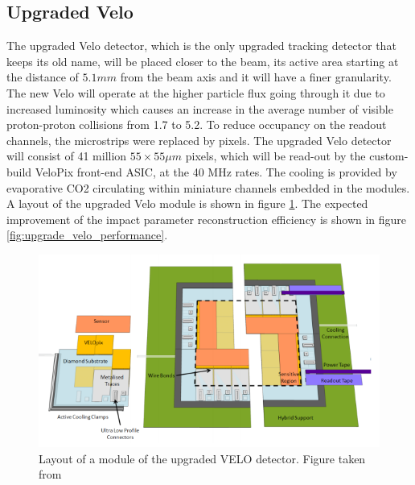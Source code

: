 \subsection{Upgraded Velo}
The upgraded Velo detector, which is the only upgraded tracking detector that keeps its old name, will be placed closer to the beam, its active area starting at the distance of $5.1 mm$ from the beam axis and it will have a finer granularity. The new Velo will operate at the higher particle flux going through it due to increased luminosity which causes an increase in the average number of visible proton-proton collisions from 1.7 to 5.2. To reduce occupancy on the readout channels, the microstrips were replaced by pixels. The upgraded Velo detector will consist of 41 million $55\times 55 \mu m$ pixels, which will be read-out by the custom-build VeloPix front-end ASIC, at the 40 MHz rates. 
The cooling is provided by evaporative CO2 circulating within miniature channels embedded in the modules.
A layout of the upgraded Velo module is shown in figure \ref{fig:veloUpgradeModule}. 
The expected improvement of the impact parameter reconstruction efficiency is shown in figure \ref{fig:upgrade_velo_performance}.    

\begin{figure}[!h]
\centering
\includegraphics[width=\linewidth]{figures/Velo_upgraded_module.PNG}
\caption{Layout of a module of the upgraded VELO detector. Figure taken from \cite{velo_upgrade_tdr}
\label{fig:veloUpgradeModule}}
\end{figure}




